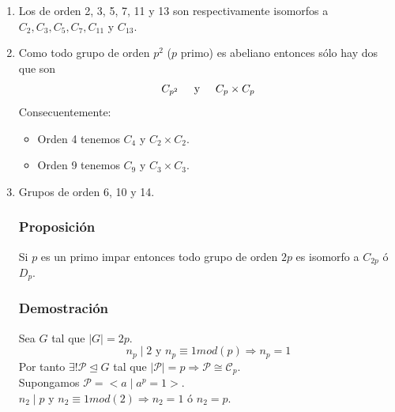 \documentclass[11pt,a4paper]{article}
\begin{document}
\begin{enumerate}[label = (\arabic*)]
\item Los de orden 2, 3, 5, 7, 11 y 13 son respectivamente isomorfos a $C_{2}, C_{3}, C_{5}, C_{7}, C_{11}$ y $C_{13}$.
\item Como todo grupo de orden $p^{2}$ ($p$ primo) es abeliano entonces sólo hay dos que son
$$C_{p^{2}} \hspace{0.5cm} \text{y} \hspace{0.5cm} C_{p} \times C_{p}$$
Consecuentemente:
\begin{itemize}
\item Orden 4 tenemos $C_{4}$ y $C_{2} \times C_{2}$.
\item Orden 9 tenemos $C_{9}$ y $C_{3} \times C_{3}$.
\end{itemize}
\item Grupos de orden 6, 10 y 14.

\subsubsection*{Proposición}

Si $p$ es un primo impar entonces todo grupo de orden $2p$ es isomorfo a $C_{2p}$ ó $D_{p}$.

\subsubsection*{Demostración}

Sea $G$ tal que $|G| = 2p$.
$$n_{p} \mid 2 \text{ y } n_{p} \equiv 1 mod (p) \Rightarrow n_{p} = 1$$
Por tanto $\exists ! \mathcal{P} \unlhd G$ tal que $|\mathcal{P}| = p \Rightarrow \mathcal{P} \cong \mathcal{C}_{p}$. \\
Supongamos $\mathcal{P} = <a \mid a^{p} = 1>$. \\
$n_{2} \mid p$ y $n_{2} \equiv 1 mod(2) \Rightarrow n_{2} = 1$ ó $n_{2} = p$.


\end{enumerate}
\end{document}

